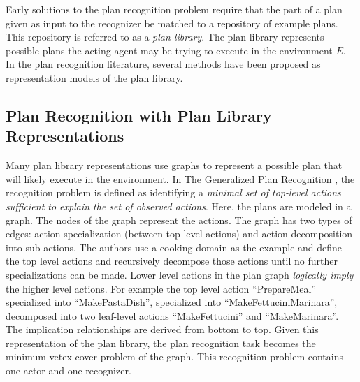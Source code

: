 Early solutions to the plan recognition problem require that the part of a plan given as input to the recognizer be matched to a repository of example plans. This repository is referred to as a \textit{plan library}. The plan library represents possible plans the acting agent may be trying to execute in the environment $E$. In the plan recognition literature, several methods have been proposed as representation models of the plan library.

\subsection{Plan Recognition with Plan Library Representations}
Many plan library representations use graphs to represent a possible plan that will likely execute in the environment. 
In The Generalized Plan Recognition \cite{kautz1986generalized}, the recognition problem is defined as identifying a \textit{minimal set of top-level actions sufficient to explain the set of observed actions}. 
Here, the plans are modeled in a graph. 
The nodes of the graph represent the actions. 
The graph has two types of edges: action specialization (between top-level actions) and action decomposition into sub-actions.
The authors use a cooking domain as the example and define the top level actions and recursively decompose those actions until no further specializations can be made. 
Lower level actions in the plan graph \textit{logically imply} the higher level actions. 
For example the top level action ``PrepareMeal'' specialized into ``MakePastaDish'', specialized into ``MakeFettuciniMarinara'', decomposed into two leaf-level actions ``MakeFettucini'' and ``MakeMarinara''. The implication relationships are derived from bottom to top. Given this representation of the plan library, the plan recognition task becomes the minimum vetex cover problem of the graph. This recognition problem contains one actor and one recognizer.

